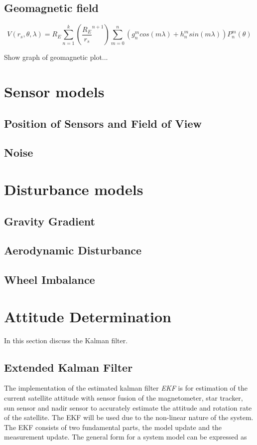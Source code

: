\subsection{Geomagnetic field}

\begin{equation}
\label{Eq-Geomagnetic_field}
V(r_s,\theta, \lambda) = R_E \sum_{n=1}^{k}\left(\frac{R_E}{r_s}^{n+1}\right)\sum_{m=0}^{n}\left(g_n^mcos(m\lambda) + h_n^msin(m\lambda)\right)P_n^m(\theta)
\end{equation}

Show graph of geomagnetic plot...

\section{Sensor models}
\subsection{Position of Sensors and Field of View}

\subsection{Noise}

\section{Disturbance models}
\subsection{Gravity Gradient}

\subsection{Aerodynamic Disturbance}
\cite{Steyn2014}

\subsection{Wheel Imbalance}

\section{Attitude Determination}
In this section discuss the Kalman filter.

\subsection{Extended Kalman Filter}
The implementation of the estimated kalman filter \emph{EKF} is for estimation of the current satellite attitude with sensor fusion of the magnetometer, star tracker, sun sensor and nadir sensor to accurately estimate the attitude and rotation rate of the satellite. The EKF will be used due to the non-linear nature of the system. The EKF consists of two fundamental parts, the model update and the measurement update. The general form for a system model can be expressed as

